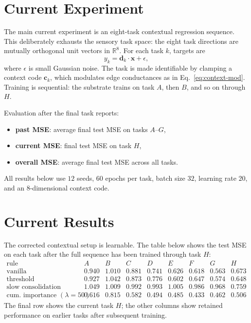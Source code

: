 \documentclass[11pt]{article}
\begin{document}
\section{Current Experiment}

The main current experiment is an eight-task contextual regression
sequence. This deliberately exhausts the sensory task space: the eight
task directions are mutually orthogonal unit vectors in $\mathbb{R}^8$.
For each task $k$, targets are
\[
y_k = \mathbf{d}_k \cdot \mathbf{x} + \epsilon,
\]
where $\epsilon$ is small Gaussian noise. The task is made identifiable
by clamping a context code $\mathbf{c}_k$, which modulates edge
conductances as in Eq.~\ref{eq:context-mod}. Training is sequential: the
substrate trains on task $A$, then $B$, and so on through $H$.

Evaluation after the final task reports:
\begin{itemize}
\item \textbf{past MSE}: average final test MSE on tasks $A$--$G$,
\item \textbf{current MSE}: final test MSE on task $H$,
\item \textbf{overall MSE}: average final test MSE across all tasks.
\end{itemize}
All results below use $12$ seeds, $60$ epochs per task, batch size $32$,
learning rate $20$, and an $8$-dimensional context code.

\section{Current Results}

The corrected contextual setup is learnable. The table below shows the
test MSE on each task after the full sequence has been trained through
task $H$:
\[
\begin{array}{l|cccccccc}
\text{rule} & A & B & C & D & E & F & G & H \\
\hline
\text{vanilla} & 0.940 & 1.010 & 0.881 & 0.741 & 0.626 & 0.618 & 0.563 & 0.673\\
\text{threshold} & 0.927 & 1.042 & 0.873 & 0.776 & 0.602 & 0.647 & 0.574 & 0.648\\
\text{slow consolidation} & 1.049 & 1.009 & 0.992 & 0.993 & 1.005 & 0.986 & 0.968 & 0.759\\
\text{cum. importance }(\lambda=50) & 0.616 & 0.815 & 0.582 & 0.494 & 0.485 & 0.433 & 0.462 & 0.506
\end{array}
\]
The final row shows the current task $H$; the other columns show retained
performance on earlier tasks after subsequent training.
\end{document}
